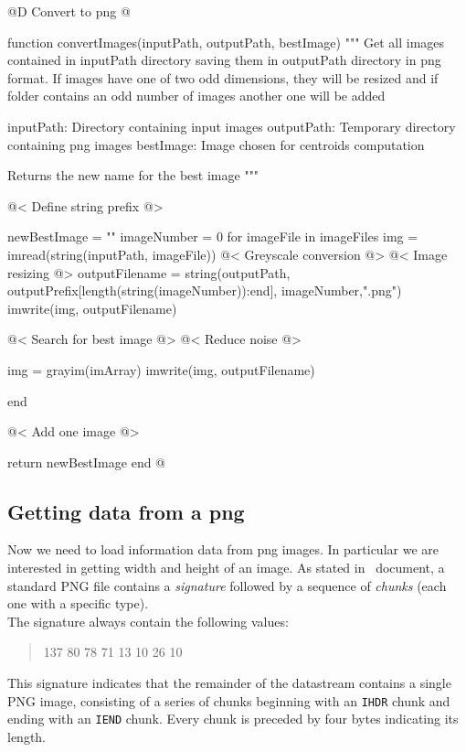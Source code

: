 \documentclass[11pt,oneside]{article}	%
\begin{document}
@D Convert to png
@{function convertImages(inputPath, outputPath, bestImage)
  """
  Get all images contained in inputPath directory
  saving them in outputPath directory in png format.
  If images have one of two odd dimensions, they will be resized
  and if folder contains an odd number of images another one will be
  added

  inputPath: Directory containing input images
  outputPath: Temporary directory containing png images
  bestImage: Image chosen for centroids computation

  Returns the new name for the best image
  """

  @< Define string prefix @>
  
  newBestImage = ""
  imageNumber = 0
  for imageFile in imageFiles
    img = imread(string(inputPath, imageFile))
    @< Greyscale conversion @>
    @< Image resizing @>
    outputFilename = string(outputPath, outputPrefix[length(string(imageNumber)):end],
			      imageNumber,".png")
    imwrite(img, outputFilename)

    @< Search for best image @>
    @< Reduce noise @>
    
    img = grayim(imArray)
    imwrite(img, outputFilename)

  end

  @< Add one image @>

  return newBestImage
end
@}

\subsection{Getting data from a png}\label{sec:getData}

Now we need to load information data from png images. In particular we are interested in getting width and height of an image. As stated in~\cite{W3CPNG} document, a standard PNG file contains a \textit{signature} followed by a sequence of \textit{chunks} (each one with a specific type).\\

The signature always contain the following values:

\begin{quote}
 137 80 78 71 13 10 26 10
\end{quote}
   
This signature indicates that the remainder of the datastream contains a single PNG image, consisting of a series of chunks beginning with an \texttt{IHDR} chunk and ending with an \texttt{IEND} chunk. Every chunk is preceded by four bytes indicating its length.
\end{document}
